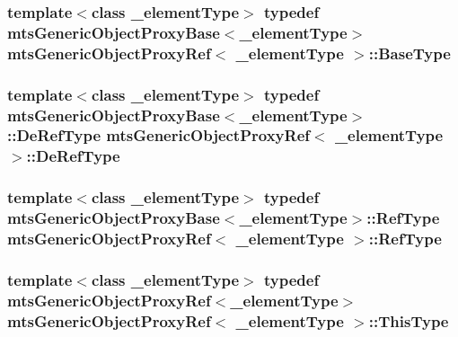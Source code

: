 \subsubsection[{Base\+Type}]{\setlength{\rightskip}{0pt plus 5cm}template$<$class \+\_\+element\+Type$>$ typedef {\bf mts\+Generic\+Object\+Proxy\+Base}$<$\+\_\+element\+Type$>$ {\bf mts\+Generic\+Object\+Proxy\+Ref}$<$ \+\_\+element\+Type $>$\+::{\bf Base\+Type}}\label{classmts_generic_object_proxy_ref_a52a477c15ddc935700cf9fdbe9da0dcf}
\hypertarget{classmts_generic_object_proxy_ref_af6b06c46f460ed5aca8fbe05ab6bde61}{}
\subsubsection[{De\+Ref\+Type}]{\setlength{\rightskip}{0pt plus 5cm}template$<$class \+\_\+element\+Type$>$ typedef {\bf mts\+Generic\+Object\+Proxy\+Base}$<$\+\_\+element\+Type$>$\+::{\bf De\+Ref\+Type} {\bf mts\+Generic\+Object\+Proxy\+Ref}$<$ \+\_\+element\+Type $>$\+::{\bf De\+Ref\+Type}}\label{classmts_generic_object_proxy_ref_af6b06c46f460ed5aca8fbe05ab6bde61}
\hypertarget{classmts_generic_object_proxy_ref_a2b4ed89cb2db6ed1dd47d1352ada6be8}{}
\subsubsection[{Ref\+Type}]{\setlength{\rightskip}{0pt plus 5cm}template$<$class \+\_\+element\+Type$>$ typedef {\bf mts\+Generic\+Object\+Proxy\+Base}$<$\+\_\+element\+Type$>$\+::{\bf Ref\+Type} {\bf mts\+Generic\+Object\+Proxy\+Ref}$<$ \+\_\+element\+Type $>$\+::{\bf Ref\+Type}}\label{classmts_generic_object_proxy_ref_a2b4ed89cb2db6ed1dd47d1352ada6be8}
\hypertarget{classmts_generic_object_proxy_ref_a02e3c6255922d05f1fc627ee67dd3bd9}{}
\subsubsection[{This\+Type}]{\setlength{\rightskip}{0pt plus 5cm}template$<$class \+\_\+element\+Type$>$ typedef {\bf mts\+Generic\+Object\+Proxy\+Ref}$<$\+\_\+element\+Type$>$ {\bf mts\+Generic\+Object\+Proxy\+Ref}$<$ \+\_\+element\+Type $>$\+::{\bf This\+Type}}\label{classmts_generic_object_proxy_ref_a02e3c6255922d05f1fc627ee67dd3bd9}
\hypertarget{classmts_generic_object_proxy_ref_af50eac4bbf86d9609d7cd77c33d4bf54}{}
